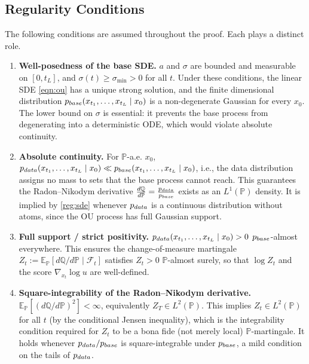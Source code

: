\documentclass{article}
\newcommand{\pdata}{p_{\normalfont{data}}}
\newcommand{\pbase}{p_{\normalfont{base}}}
\newcommand{\PP}{\mathbb{P}}
\newcommand{\QQ}{\mathbb{Q}}
\newcommand{\EE}{\mathbb{E}}
\newcommand{\FF}{\mathcal{F}}
\begin{document}
\subsection{Regularity Conditions}\label{sec:regularity}

The following conditions are assumed throughout the proof.  Each plays a distinct role.

\begin{enumerate}[label=\textbf{(R\arabic*)}]

\item \label{reg:sde}
  \textbf{Well-posedness of the base SDE.}
  $a$ and $\sigma$ are bounded and measurable on $[0,t_L]$, and $\sigma(t)\geq\sigma_{\min}>0$
  for all $t$.
  Under these conditions, the linear SDE \eqref{eqn:ou} has a unique strong solution, and
  the finite dimensional distribution $\pbase(x_{t_1},\ldots,x_{t_L}\mid x_0)$ is a
  non-degenerate Gaussian for every $x_0$.
  The lower bound on $\sigma$ is essential: it prevents the base process from
  degenerating into a deterministic ODE, which would violate absolute continuity.

\item \label{reg:abscon}
  \textbf{Absolute continuity.}
  For $\PP$-a.e. $x_0$,
  $\pdata(x_{t_1},\ldots,x_{t_L}\mid x_0)\ll\pbase(x_{t_1},\ldots,x_{t_L}\mid x_0)$,
  i.e., the data distribution assigns no mass to sets that the base process
  cannot reach.  This guarantees the Radon--Nikodym derivative
  $\frac{d\QQ}{d\PP}=\frac{\pdata}{\pbase}$ exists as an $L^1(\PP)$ density.
  It is implied by \ref{reg:sde} whenever $\pdata$ is a continuous distribution
  without atoms, since the OU process has full Gaussian support.

\item \label{reg:fullsupport}
  \textbf{Full support / strict positivity.}
  $\pdata(x_{t_1},\ldots,x_{t_L}\mid x_0)>0$ $\pbase$-almost everywhere.
  This ensures the change-of-measure martingale $Z_t:=\EE_\PP[d\QQ/d\PP\mid\FF_t]$
  satisfies $Z_t>0$ $\PP$-almost surely, so that $\log Z_t$ and the score
  $\nabla_{x_t}\log u$ are well-defined.

\item \label{reg:squareint}
  \textbf{Square-integrability of the Radon--Nikodym derivative.}
  $\EE_\PP[(d\QQ/d\PP)^2]<\infty$, equivalently $Z_T\in L^2(\PP)$.
  This implies $Z_t\in L^2(\PP)$ for all $t$ (by the conditional Jensen inequality),
  which is the integrability condition required for $Z_t$ to be a bona fide
  (not merely local) $\PP$-martingale.  It holds whenever $\pdata/\pbase$ is
  square-integrable under $\pbase$, a mild condition on the tails of $\pdata$.


\end{enumerate}
\end{document}
